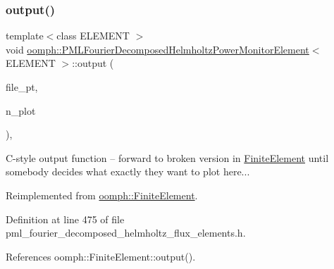 \subsubsection{\texorpdfstring{output()}{output()}\hspace{0.1cm}{\footnotesize\ttfamily [4/4]}}
{\footnotesize\ttfamily template$<$class E\+L\+E\+M\+E\+NT $>$ \\
void \hyperlink{classoomph_1_1PMLFourierDecomposedHelmholtzPowerMonitorElement}{oomph\+::\+P\+M\+L\+Fourier\+Decomposed\+Helmholtz\+Power\+Monitor\+Element}$<$ E\+L\+E\+M\+E\+NT $>$\+::output (\begin{DoxyParamCaption}\item[{F\+I\+LE $\ast$}]{file\+\_\+pt,  }\item[{const unsigned \&}]{n\+\_\+plot }\end{DoxyParamCaption})\hspace{0.3cm}{\ttfamily [inline]}, {\ttfamily [virtual]}}



C-\/style output function -- forward to broken version in \hyperlink{classoomph_1_1FiniteElement}{Finite\+Element} until somebody decides what exactly they want to plot here... 



Reimplemented from \hyperlink{classoomph_1_1FiniteElement_adfaee690bb0608f03320eeb9d110d48c}{oomph\+::\+Finite\+Element}.



Definition at line 475 of file pml\+\_\+fourier\+\_\+decomposed\+\_\+helmholtz\+\_\+flux\+\_\+elements.\+h.



References oomph\+::\+Finite\+Element\+::output().

\mbox{\label{classoomph_1_1PMLFourierDecomposedHelmholtzPowerMonitorElement_a9e879d51e62110b3c59074b5a6497717}} 
